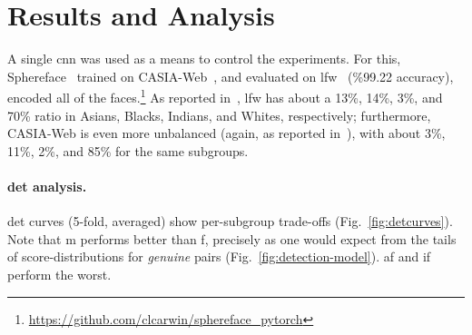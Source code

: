
\section{Results and Analysis}
A single \gls{cnn} was used as a means to control the experiments. For this, Sphereface~\cite{liu2017sphereface} trained on CASIA-Web~\cite{yi2014learning}, and evaluated on \gls{lfw}~\cite{LFWTech} (\%99.22 accuracy), encoded all of the faces.\footnote{\href{$https://github.com/clcarwin/sphereface\_pytorch$}{https://github.com/clcarwin/sphereface\_pytorch}} As reported in~\cite{wang2019racial}, \gls{lfw} has about a 13\%, 14\%, 3\%, and 70\% ratio in Asians, Blacks, Indians, and Whites, respectively; furthermore, CASIA-Web is even more unbalanced (again, as reported in~\cite{wang2019racial}), with about  3\%, 11\%, 2\%, and 85\% for the same subgroups.
\vspace{-4mm}
\noindent\paragraph{\gls{det} analysis.}
\gls{det} curves (5-fold, averaged) show per-subgroup trade-offs (Fig.~\ref{fig:detcurves}). Note that \gls{m} performs better than \gls{f}, precisely as one would expect from the tails of score-distributions for \emph{genuine} pairs (Fig.~\ref{fig:detection-model}). \Gls{af} and \gls{if} perform the worst.

\vspace{-4mm}

